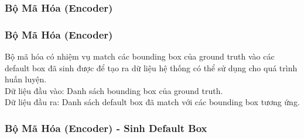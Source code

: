 \documentclass{beamer}
\begin{document}
	\subsubsection{Bộ Mã Hóa (Encoder)}
	
	\begin{frame}
		\frametitle{Bộ Mã Hóa (Encoder)}
		
		Bộ mã hóa có nhiệm vụ match các bounding box của ground truth vào các default box đã sinh được để tạo ra dữ liệu hệ thống có thể sử dụng cho quá trình huấn luyện.\\
		
		Dữ liệu đầu vào: Danh sách bounding box của ground truth.\\
		
		Dữ liệu đầu ra: Danh sách default box đã match với các bounding box tương ứng.
		
	\end{frame}
	
	\begin{frame}
		\frametitle{Bộ Mã Hóa (Encoder) - Sinh Default Box}
		
	\end{frame}
	
	
\end{document}
